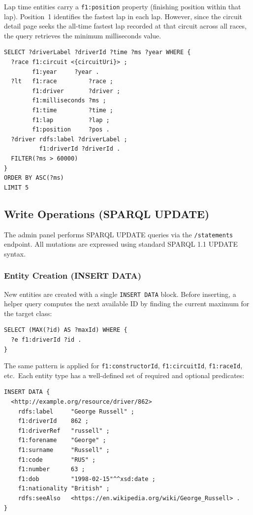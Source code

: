 \documentclass[12pt,a4paper]{article}
\begin{document}
Lap time entities carry a \texttt{f1:position} property (finishing position
within that lap). Position~1 identifies the fastest lap in each lap. However,
since the circuit detail page seeks the all-time fastest lap recorded at that
circuit across all races, the query retrieves the minimum milliseconds value.

\begin{lstlisting}[style=sparql, caption={Fastest laps ever recorded at a circuit}]
SELECT ?driverLabel ?driverId ?time ?ms ?year WHERE {
  ?race f1:circuit <{circuitUri}> ;
        f1:year     ?year .
  ?lt   f1:race         ?race ;
        f1:driver       ?driver ;
        f1:milliseconds ?ms ;
        f1:time         ?time ;
        f1:lap          ?lap ;
        f1:position     ?pos .
  ?driver rdfs:label ?driverLabel ;
          f1:driverId ?driverId .
  FILTER(?ms > 60000)
}
ORDER BY ASC(?ms)
LIMIT 5
\end{lstlisting}

\subsection{Write Operations (SPARQL UPDATE)}

The admin panel performs SPARQL UPDATE queries via the
\texttt{/statements} endpoint. All mutations are expressed using standard
SPARQL 1.1 UPDATE syntax.

\subsubsection{Entity Creation (INSERT DATA)}

New entities are created with a single \texttt{INSERT DATA} block. Before
inserting, a helper query computes the next available ID by finding the current
maximum for the target class:

\begin{lstlisting}[style=sparql, caption={Maximum ID query for sequential ID generation (shown for drivers; analogous for all entity types)}]
SELECT (MAX(?id) AS ?maxId) WHERE {
  ?e f1:driverId ?id .
}
\end{lstlisting}

The same pattern is applied for \texttt{f1:constructorId}, \texttt{f1:circuitId},
\texttt{f1:raceId}, etc.\ Each entity type has a well-defined set of required
and optional predicates:

\begin{lstlisting}[style=sparql, caption={INSERT DATA for a new driver with all fields}]
INSERT DATA {
  <http://example.org/resource/driver/862>
    rdfs:label     "George Russell" ;
    f1:driverId    862 ;
    f1:driverRef   "russell" ;
    f1:forename    "George" ;
    f1:surname     "Russell" ;
    f1:code        "RUS" ;
    f1:number      63 ;
    f1:dob         "1998-02-15"^^xsd:date ;
    f1:nationality "British" ;
    rdfs:seeAlso   <https://en.wikipedia.org/wiki/George_Russell> .
}
\end{lstlisting}
\end{document}
